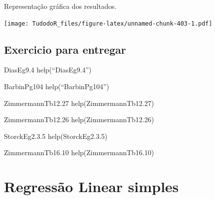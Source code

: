 \documentclass[
]{book}
\newenvironment{Shaded}{\begin{snugshade}}{\end{snugshade}}
\newcommand{\DataTypeTok}[1]{\textcolor[rgb]{0.13,0.29,0.53}{#1}}
\newcommand{\DecValTok}[1]{\textcolor[rgb]{0.00,0.00,0.81}{#1}}
\newcommand{\FloatTok}[1]{\textcolor[rgb]{0.00,0.00,0.81}{#1}}
\newcommand{\KeywordTok}[1]{\textcolor[rgb]{0.13,0.29,0.53}{\textbf{#1}}}
\newcommand{\NormalTok}[1]{#1}
\newcommand{\OperatorTok}[1]{\textcolor[rgb]{0.81,0.36,0.00}{\textbf{#1}}}
\newcommand{\StringTok}[1]{\textcolor[rgb]{0.31,0.60,0.02}{#1}}
\begin{document}
Representação gráfica dos resultados.

\begin{Shaded}
\end{Shaded}

\texttt{[image: TudodoR\_files/figure-latex/unnamed-chunk-403-1.pdf]}

\hypertarget{exercicio-para-entregar}{%
\subsection{Exercicio para entregar}\label{exercicio-para-entregar}}

DiasEg9.4
help(``DiasEg9.4'')

BarbinPg104
help(``BarbinPg104'')

ZimmermannTb12.27
help(ZimmermannTb12.27)

ZimmermannTb12.26
help(ZimmermannTb12.26)

StorckEg2.3.5
help(StorckEg2.3.5)

ZimmermannTb16.10
help(ZimmermannTb16.10)

\hypertarget{regressuxe3o-linear-simples}{%
\section{Regressão Linear simples}\label{regressuxe3o-linear-simples}}
\end{document}
